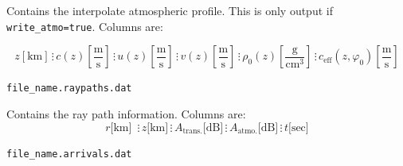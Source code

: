 \documentclass[10pt]{article}
\begin{document}
	Contains the interpolate atmospheric profile.  This is only output if \verb#write_atmo=true#.  Columns are:
	\begin{small}
	\begin{equation*}
	 z \left[ \text{km} \right] \hspace{2pt} \vdots \hspace{2pt}
	 c (z) \left[\frac{\text{m}}{\text{s}} \right] \hspace{2pt} \vdots \hspace{2pt}
	 u(z) \left[ \frac{\text{m}}{\text{s}} \right] \hspace{2pt} \vdots \hspace{2pt}
	 v(z) \left[ \frac{\text{m}}{\text{s}} \right] \hspace{2pt} \vdots \hspace{2pt}
	 \rho_0(z) \left[ \frac{\text{g}}{\text{cm}^3} \right] \hspace{2pt} \vdots \hspace{2pt}
	 c_\text{eff} \left(z, \varphi_0 \right) \left[\frac{\text{m}}{\text{s}} \right] 
	\end{equation*}
	\end{small}

\newpage

	\verb=file_name.raypaths.dat= 
	
	Contains the ray path information.  Columns are:
	\begin{equation*}
	r \text{[km] } \hspace{2pt} \vdots \hspace{2pt} 
	z\text{[km]} \hspace{2pt} \vdots \hspace{2pt}
	A_\text{trans.} \text{[dB]} \hspace{2pt} \vdots \hspace{2pt}
	A_\text{atmo.} \text{[dB]} \hspace{2pt} \vdots \hspace{2pt}	
	t \text{[sec]}
	\end{equation*}

	\verb=file_name.arrivals.dat=
	
\end{document}
